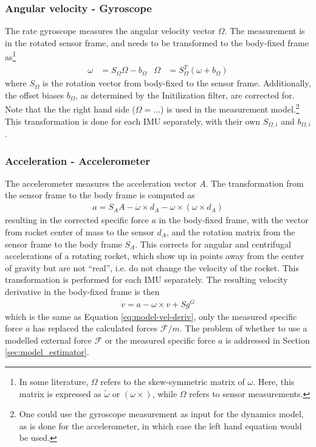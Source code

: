 \subsubsection{Angular velocity - Gyroscope}
The rate gyroscope measures the angular velocity vector $\Omega$. 
The measurement is in the rotated sensor frame, and needs to be transformed to the  body-fixed frame as\footnote{In some literature, $\Omega$ refers to the skew-symmetric matrix of $\omega$. Here, this matrix is expressed as $\tilde \omega$ or $(\omega \times)$, while $\Omega$ refers to sensor measurements.}
\begin{align}
    \omega &= S_\Omega \Omega - b_\Omega
    &
    \Omega &= S_\Omega^T (\omega + b_\Omega)
    \label{eq:meas-gyro}
\end{align}
where $S_\Omega$ is the rotation vector from body-fixed to the sensor frame.
Additionally, the offset biases $b_\Omega$, as determined by the Initilization filter, are corrected for.
Note that the the right hand side ($\Omega = ...$) is used in the measurement model.\footnote{One could use the gyroscope measurement as input for the dynamics model, as is done for the accelerometer, in which case the left hand equation would be used.}
This transformation is done for each IMU separately, with their own $S_{\Omega, i}$ and $b_{\Omega, i}$.

\subsubsection{Acceleration - Accelerometer}
The accelerometer measures the acceleration vector $A$.
The transformation from the sensor frame to the body frame is computed as \cite{stevens2015}
\begin{align}
    a = S_A A - \dot \omega \times d_A - \omega \times (\omega \times d_A)
    \label{eq:meas-accel}
\end{align}
resulting in the corrected specific force $a$ in the body-fixed frame, with the vector from rocket center of mass to the sensor $d_A$, and the rotation matrix from the sensor frame to the body frame $S_A$.
This corrects for angular and centrifugal accelerations of a rotating rocket, which show up in points away from the center of gravity but are not ``real'', i.e. do not change the velocity of the rocket. 
This transformation is performed for each IMU separately.
The resulting velocity derivative in the body-fixed frame is then \cite{zipfel2007, stevens2015}
\begin{align}
    \dot v = a - \omega \times v + S g^G
    \label{eq:meas-veldot}
\end{align}
which is the same as Equation \ref{eq:model-vel-deriv}, only the measured specific force $a$ has replaced the calculated forces $\mathcal{F}/m$.
The problem of whether to use a modelled external force $\mathcal{F}$ or the measured specific force $a$ is addressed in Section \ref{sec:model_estimator}.

